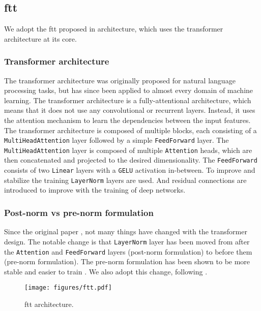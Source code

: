 \subsection{\gls{ftt}}
\label{sec:ftt}

We adopt the \gls{ftt} proposed in \cite{ft-transformer} architecture, which uses the transformer \cite{transformer}
architecture at its core.

\subsubsection{Transformer architecture}

The transformer architecture was originally proposed for natural language processing tasks, but has since been applied
to almost every domain of machine learning. The transformer architecture is a fully-attentional architecture, which
means that it does not use any convolutional \cite{convolutional} or recurrent \cite{recurrent} layers. Instead, it uses
the attention mechanism to learn the dependencies between the input features. The transformer architecture is composed
of multiple blocks, each consisting of a \verb|MultiHeadAttention| layer followed by a simple \verb|FeedForward| layer.
The \verb|MultiHeadAttention| layer is composed of multiple \verb|Attention| heads, which are then concatenated and
projected to the desired dimensionality. The \verb|FeedForward| consists of two \verb|Linear| layers with a \verb|GELU|
activation in-between. To improve and stabilize the training \verb|LayerNorm| \cite{layernorm} layers are used. And
residual connections are introduced to improve with the training of deep networks.

\subsubsection{Post-norm vs pre-norm formulation}

Since the original paper \cite{transformer}, not many things have changed with the transformer design. The notable
change is that \verb|LayerNorm| layer has been moved from after the \verb|Attention| and \verb|FeedForward| layers
(post-norm formulation) to before them (pre-norm formulation). The pre-norm formulation has been shown to be more
stable and easier to train \cite{pre-norm}. We also adopt this change, following \cite{ft-transformer}.

\begin{figure}[htbp]
    \centering
    \texttt{[image: figures/ftt.pdf]}
    \caption{\gls{ftt} architecture.}
    \label{fig:ftt}
\end{figure}

